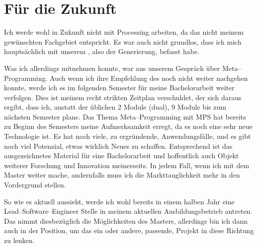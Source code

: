\documentclass[12pt]{article}
\begin{document}
    \section{Für die Zukunft}\label{sec:fur-die-zukunft}
        Ich werde wohl in Zukunft nicht mit Processing arbeiten, da das nicht meinem gewünschten Fachgebiet entspricht.
        Es war auch nicht grundlos, dass ich mich hauptsächlich mit unserem , also der Generierung, befasst habe.


        Was ich allerdings mitnehmen konnte, war aus unserem Gespräch über Meta--Programming.
        Auch wenn ich ihre Empfehlung des  noch nicht weiter nachgehen konnte, werde ich es im folgenden Semester für meine Bachelorarbeit weiter verfolgen.
        Dies ist meinem recht strikten Zeitplan verschuldet, der sich daraus ergibt, dass ich, anstatt der üblichen 2 Module (dual), 9 Module bis zum nächsten Semester plane.
        Das Thema Meta--Programming mit MPS hat bereits zu Beginn des Semesters meine Aufmerksamkeit erregt, da es noch eine sehr neue Technologie ist.
        Es hat noch viele, zu ergründende, Anwendungsfälle, und es gibt noch viel Potenzial, etwas wirklich Neues zu schaffen.
        Entsprechend ist das ausgezeichnetes Material für eine Bachelorarbeit und hoffentlich auch Objekt weiterer Forschung und Innovation meinerseits.
        In jedem Fall, wenn ich mit dem Master weiter mache, andernfalls muss ich die Markttauglichkeit mehr in den Vordergrund stellen.


        So wie es aktuell aussieht, werde ich wohl bereits in einem halben Jahr eine Lead--Software--Engineer Stelle in meinem aktuellen Ausbildungsbetrieb antreten.
        Das nimmt diesbezüglich die Möglichkeiten des Masters, allerdings bin ich dann auch in der Position, um das ein oder andere, passende, Projekt in diese Richtung zu lenken.


    \newpage
    \printbibliography
\end{document}
